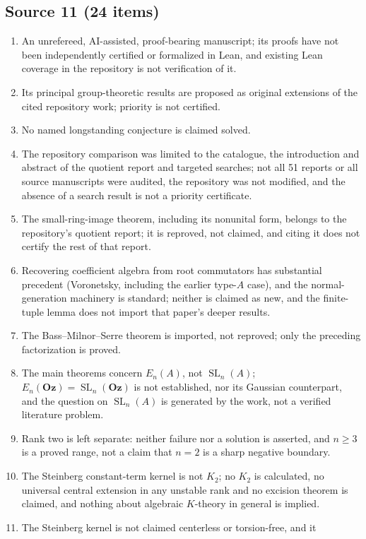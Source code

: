 \documentclass[11pt,oneside]{article}
\numberwithin{equation}{section}
\theoremstyle{definition}
\theoremstyle{remark}
\newcommand{\Oz}{\mathbf{Oz}}
\newcommand{\SL}{\operatorname{SL}}
\begin{document}
\subsection{Source 11 (24 items)}
\begin{enumerate}[leftmargin=*,widest=00,label=11.\arabic*]
\item An unrefereed, AI-assisted, proof-bearing manuscript; its proofs have not
been independently certified or formalized in Lean, and existing Lean coverage
in the repository is not verification of it.
\item Its principal group-theoretic results are proposed as original extensions
of the cited repository work; priority is not certified.
\item No named longstanding conjecture is claimed solved.
\item The repository comparison was limited to the catalogue, the introduction
and abstract of the quotient report and targeted searches; not all 51 reports or
all source manuscripts were audited, the repository was not modified, and the
absence of a search result is not a priority certificate.
\item The small-ring-image theorem, including its nonunital form, belongs to the
repository's quotient report; it is reproved, not claimed, and citing it does not
certify the rest of that report.
\item Recovering coefficient algebra from root commutators has substantial
precedent (Voronetsky, including the earlier type-$A$ case), and the
normal-generation machinery is standard; neither is claimed as new, and the
finite-tuple lemma does not import that paper's deeper results.
\item The Bass--Milnor--Serre theorem is imported, not reproved; only the
preceding factorization is proved.
\item The main theorems concern $E_n(A)$, not $\SL_n(A)$; $E_n(\Oz)=\SL_n(\Oz)$ is
not established, nor its Gaussian counterpart, and the question on $\SL_n(A)$ is
generated by the work, not a verified literature problem.
\item Rank two is left separate: neither failure nor a solution is asserted, and
$n\ge3$ is a proved range, not a claim that $n=2$ is a sharp negative boundary.
\item The Steinberg constant-term kernel is not $K_2$; no $K_2$ is calculated, no
universal central extension in any unstable rank and no excision theorem is
claimed, and nothing about algebraic $K$-theory in general is implied.
\item The Steinberg kernel is not claimed centerless or torsion-free, and it

\end{enumerate}
\end{document}
